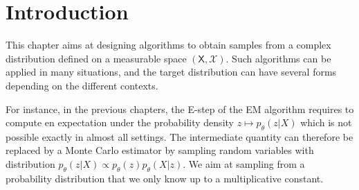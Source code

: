 \documentclass[english,graybox,envcountchap,envcountsame,sectrefs,shortlabels]{svmono}
\theoremstyle{style}
\begin{document}
\section{Introduction}
This chapter aims at designing algorithms to obtain samples from a complex distribution defined on a measurable space $(\mathsf{X},\mathcal{X})$. Such algorithms can be applied in many situations, and the target distribution can have several forms depending on the different contexts. %

For instance, in the previous chapters, the E-step of the EM algorithm requires to compute en expectation under the probability density $z \mapsto p_\theta(z|X)$ which is not possible exactly in almost all settings. The intermediate quantity  can therefore be replaced by a Monte Carlo  estimator by sampling random variables with distribution $p_\theta(z|X)\propto p_\theta(z)p_\theta(X|z)$. We aim at sampling from a probability distribution that we only know up to a multiplicative constant.

\end{document}
